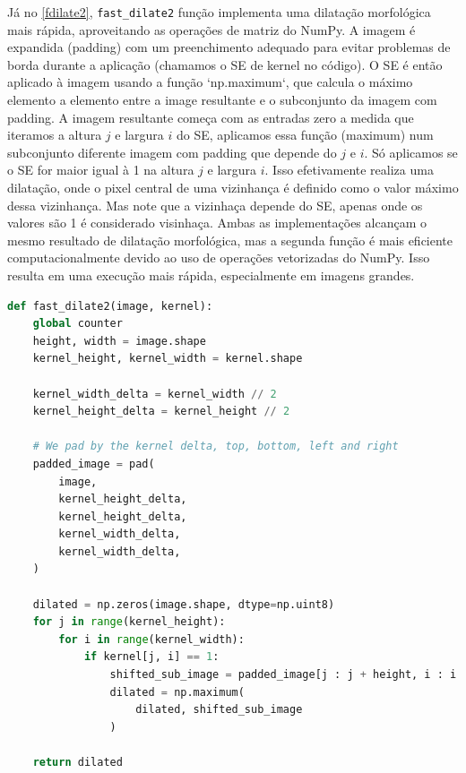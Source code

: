 \documentclass[english, 
               brazil, 
               bsc] %
               {dcomp-abntex2}
\begin{document}
Já no \autoref{fdilate2}, \texttt{fast\_dilate2} função implementa uma dilatação morfológica mais rápida, aproveitando as operações de matriz do NumPy. A imagem é expandida (padding) com um preenchimento adequado para evitar problemas de borda durante a aplicação (chamamos o SE de kernel no código). O SE é então aplicado à imagem usando a função `np.maximum`, que calcula o máximo elemento a elemento entre a image resultante e o subconjunto da imagem com padding. A imagem resultante começa com as entradas zero a medida que iteramos a altura $j$ e largura $i$ do SE, aplicamos essa função (maximum) num subconjunto diferente imagem com padding que depende do $j$ e $i$. Só aplicamos se o SE for maior igual à 1 na altura $j$ e largura $i$. Isso efetivamente realiza uma dilatação, onde o pixel central de uma vizinhança é definido como o valor máximo dessa vizinhança. Mas note que a vizinhaça depende do SE, apenas onde os valores são 1 é considerado visinhaça. Ambas as implementações alcançam o mesmo resultado de dilatação morfológica, mas a segunda função é mais eficiente computacionalmente devido ao uso de operações vetorizadas do NumPy. Isso resulta em uma execução mais rápida, especialmente em imagens grandes.

\begin{codigo}[h]
  \caption{\small.}
 \label{fdilate2}
\begin{lstlisting}[language=python]
def fast_dilate2(image, kernel):
    global counter 
    height, width = image.shape
    kernel_height, kernel_width = kernel.shape

    kernel_width_delta = kernel_width // 2
    kernel_height_delta = kernel_height // 2

    # We pad by the kernel delta, top, bottom, left and right
    padded_image = pad(
        image,
        kernel_height_delta,
        kernel_height_delta,
        kernel_width_delta,
        kernel_width_delta,
    )

    dilated = np.zeros(image.shape, dtype=np.uint8)
    for j in range(kernel_height):
        for i in range(kernel_width):
            if kernel[j, i] == 1:
                shifted_sub_image = padded_image[j : j + height, i : i + width]
                dilated = np.maximum(
                    dilated, shifted_sub_image
                )

    return dilated
\end{lstlisting}
\end{codigo}
\end{document}
